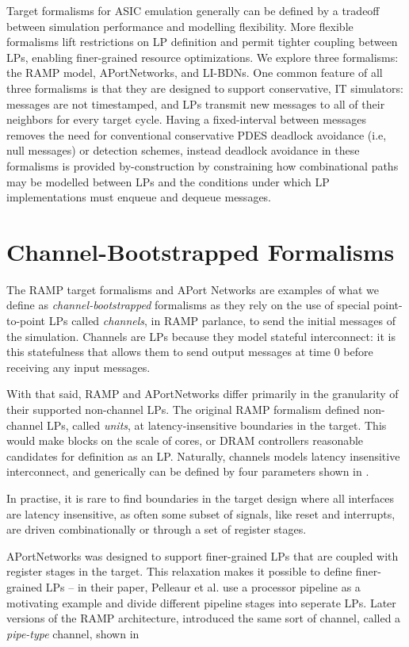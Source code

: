 Target formalisms for ASIC emulation generally can be defined by a tradeoff
between simulation performance and modelling flexibility. More flexible
formalisms lift restrictions on LP definition and permit tighter coupling
between LPs, enabling finer-grained resource optimizations. We explore three
formalisms: the RAMP model, APortNetworks, and LI-BDNs. One common feature of
all three formalisms is that they are designed to support conservative, IT
simulators: messages are not timestamped, and LPs transmit new messages to all
of their neighbors for every target cycle. Having a fixed-interval between
messages removes the need for conventional conservative PDES deadlock avoidance
(i.e, null messages) or detection schemes, instead deadlock avoidance in these
formalisms is provided by-construction by constraining how combinational paths
may be modelled between LPs and the conditions under which LP implementations
must enqueue and dequeue messages.

\section{Channel-Bootstrapped Formalisms}

The RAMP target formalisms and APort Networks are examples of what we define as
\emph{channel-bootstrapped} formalisms as they rely on the use of special
point-to-point LPs called \emph{channels}, in RAMP parlance, to send the
initial messages of the simulation. Channels are LPs because they
model stateful interconnect: it is this statefulness that allows them to send output
messages at time 0 before receiving any input messages.

With that said, RAMP and APortNetworks differ primarily in the granularity of
their supported non-channel LPs. The original RAMP formalism defined
non-channel LPs, called \emph{units}, at latency-insensitive boundaries in the
target. This would make blocks on the scale of cores, or DRAM controllers
reasonable candidates for definition as an LP. Naturally, channels models latency
insensitive interconnect, and generically can be defined by four parameters shown in .

In practise, it is rare to find boundaries in the target design where all
interfaces are latency insensitive, as often some subset of signals, like reset
and interrupts, are driven combinationally or through a set of register stages.

APortNetworks was designed to support finer-grained LPs that are coupled with
register stages in the target. This relaxation makes it possible to define
finer-grained LPs -- in their paper, Pelleaur et al. use a processor pipeline
as a motivating example and divide different pipeline stages into seperate LPs.
Later versions of the RAMP architecture, introduced the same sort of channel,
called a \emph{pipe-type} channel, shown in 

